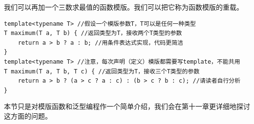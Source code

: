 我们可以再加一个三数求最值的函数模版。我们可以把它称为函数模版的重载。
\begin{lstlisting}
template<typename T> //假设一个模版参数T，T可以是任何一种类型
T maximum(T a, T b) { //返回类型为T，接收两个T类型的参数
    return a > b ? a : b; //用条件表达式实现，代码更简洁
}
template<typename T> //注意，每次声明（定义）模版都需要写template，不能共用
T maximum(T a, T b, T c) { //返回类型为T，接收三个T类型的参数
    return a > b ? (a > c ? a : c) : (b > c ? b : c); //请读者自行分析
}
\end{lstlisting}
本节只是对模版函数和泛型编程作一个简单介绍，我们会在第十一章更详细地探讨这方面的问题。\par
